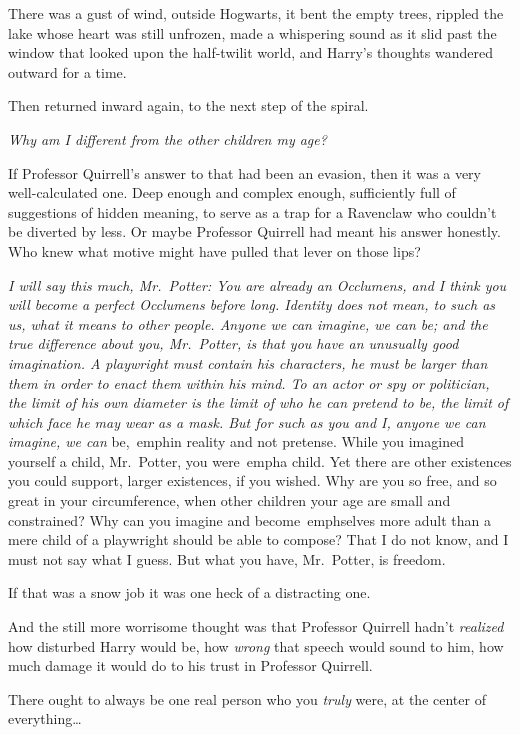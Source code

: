 There was a gust of wind, outside Hogwarts, it bent the empty trees, rippled 
the lake whose heart was still unfrozen, made a whispering sound as it slid 
past the window that looked upon the half-twilit world, and Harry's thoughts 
wandered outward for a time.

Then returned inward again, to the next step of the spiral.

\emph{Why am I different from the other children my age?}

If Professor Quirrell's answer to that had been an evasion, then it was a very 
well-calculated one. Deep enough and complex enough, sufficiently full of 
suggestions of hidden meaning, to serve as a trap for a Ravenclaw who couldn't 
be diverted by less. Or maybe Professor Quirrell had meant his answer honestly. 
Who knew what motive might have pulled that lever on those lips?

\emph{I will say this much, Mr.~Potter: You are already an Occlumens, and I 
think you will become a perfect Occlumens before long. Identity does not mean, 
to such as us, what it means to other people. Anyone we can imagine, we can be; 
and the true difference about you, Mr.~Potter, is that you have an unusually 
good imagination. A playwright must contain his characters, he must be larger 
than them in order to enact them within his mind. To an actor or spy or 
politician, the limit of his own diameter is the limit of who he can pretend to 
be, the limit of which face he may wear as a mask. But for such as you and I, 
anyone we can imagine, we can} be,\ emph{in reality and not pretense. While you 
imagined yourself a child, Mr.~Potter, you} were\ emph{a child. Yet there are 
other existences you could support, larger existences, if you wished. Why are 
you so free, and so great in your circumference, when other children your age 
are small and constrained? Why can you imagine and} become\ emph{selves more 
adult than a mere child of a playwright should be able to compose? That I do 
not know, and I must not say what I guess. But what you have, Mr.~Potter, is 
freedom.}

If that was a snow job it was one heck of a distracting one.

And the still more worrisome thought was that Professor Quirrell hadn't 
\emph{realized} how disturbed Harry would be, how \emph{wrong} that speech 
would sound to him, how much damage it would do to his trust in Professor 
Quirrell.

There ought to always be one real person who you \emph{truly} were, at the 
center of everything{\ldots}

